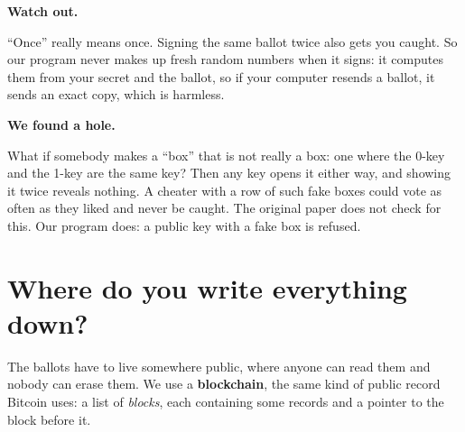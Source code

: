 \documentclass[11pt,a4paper]{article}
\newenvironment{aside}[1][Aside]{%
  \def\FrameCommand{\fboxsep=8pt\fcolorbox{boxrule}{boxbg}}%
  \MakeFramed{\advance\hsize-2\fboxsep\FrameRestore}%
  \noindent\textbf{#1.}\par\smallskip%
}{\endMakeFramed}
\newenvironment{warning}[1][Watch out]{%
  \def\FrameCommand{\fboxsep=8pt\fcolorbox{warnrule}{warnbg}}%
  \MakeFramed{\advance\hsize-2\fboxsep\FrameRestore}%
  \noindent\textbf{#1.}\par\smallskip%
}{\endMakeFramed}
\begin{document}
\begin{warning}
``Once'' really means once. Signing the same ballot twice also gets you
caught. So our program never makes up fresh random numbers when it signs:
it computes them from your secret and the ballot, so if your computer
resends a ballot, it sends an exact copy, which is harmless.
\end{warning}

\begin{aside}[We found a hole]
What if somebody makes a ``box'' that is not really a box: one where the
0-key and the 1-key are the same key? Then any key opens it either way, and
showing it twice reveals nothing. A cheater with a row of such fake boxes
could vote as often as they liked and never be caught. The original paper
does not check for this. Our program does: a public key with a fake box is
refused.
\end{aside}

\section{Where do you write everything down?}

The ballots have to live somewhere public, where anyone can read them and
nobody can erase them. We use a \textbf{blockchain}, the same kind of
public record Bitcoin uses: a list of \emph{blocks}, each containing some
records and a pointer to the block before it.

\begin{center}
\end{center}
\end{document}

